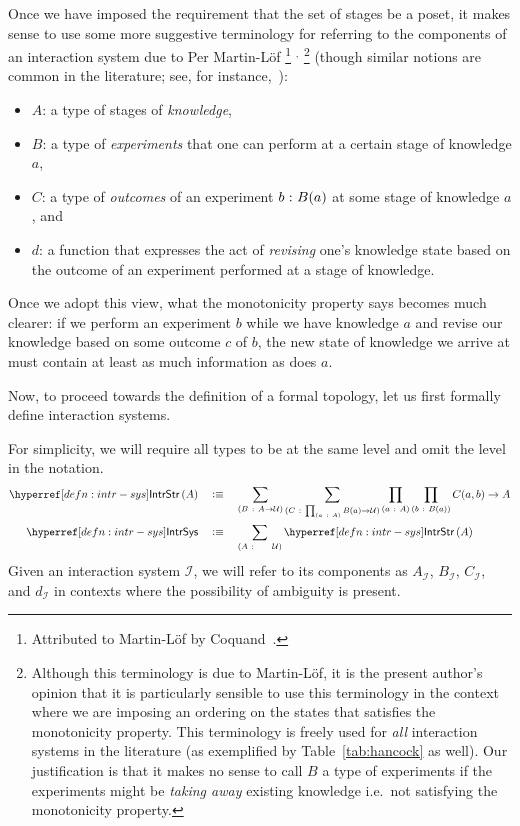 Once we have imposed the requirement that the set of stages be a poset, it makes sense to
use some more suggestive terminology for referring to the components of an interaction
system due to Per Martin-Löf%
\footnote{%
  Attributed to Martin-Löf by Coquand~\cite[pg.~2]{coq-posets}.
}%
$^{,}$%
\footnote{%
  Although this terminology is due to Martin-Löf, it is the present author's opinion that
  it is particularly sensible to use this terminology in the context where we are imposing
  an ordering on the states that satisfies the monotonicity property. This terminology is
  freely used for \emph{all} interaction systems in the literature (as exemplified by
  Table~\ref{tab:hancock} as well). Our justification is that it makes no sense to call
  $B$ a type of experiments if the experiments might be \emph{taking away} existing
  knowledge i.e.~not satisfying the monotonicity property.
}
(though similar notions are common in the literature; see, for
instance,~\cite{philosophically-plausible}):
\begin{itemize}
  \item $A$: a type of stages of \emph{knowledge},
  \item $B$: a type of \emph{experiments} that one can perform at a certain stage of
    knowledge $a$,
  \item $C$: a type of \emph{outcomes} of an experiment $b\hspace{0.1mm}:\hspace{0.1mm}B(a)$ at some stage of
    knowledge $a$, and
  \item $d$: a function that expresses the act of \emph{revising} one's knowledge state
    based on the outcome of an experiment performed at a stage of knowledge.
\end{itemize}

Once we adopt this view, what the monotonicity property says becomes much clearer: if we
perform an experiment $b$ while we have knowledge $a$ and revise our knowledge based on
some outcome $c$ of $b$, the new state of knowledge we arrive at must contain at least as
much information as does $a$.

Now, to proceed towards the definition of a formal topology, let us first formally define
interaction systems.
\begin{defn}\label{defn:intr-sys}
  For simplicity, we will require all types to be at the same level and omit the level
  in the notation.
  \begin{align*}
    \treestr{A} &\quad\is\quad
      \sigmaty{B}{A \rightarrow \univ}{
        \sigmaty{C}{\pity{a}{A}{B(a) \rightarrow \univ{}}}{
          \pity{a}{A}{\pity{b}{B(a)}{C(a, b) \rightarrow A}}
        }
      }\\
    \intrsys{} &\quad\is\quad \sigmaty{A}{~~~~\univ}{\treestr{A}}
  \end{align*}
  Given an interaction system $\mathcal{I}$, we will refer to its components as
  $A_{\mathcal{I}}$, $B_{\mathcal{I}}$, $C_{\mathcal{I}}$, and $d_{\mathcal{I}}$ in
  contexts where the possibility of ambiguity is present.
\end{defn}

